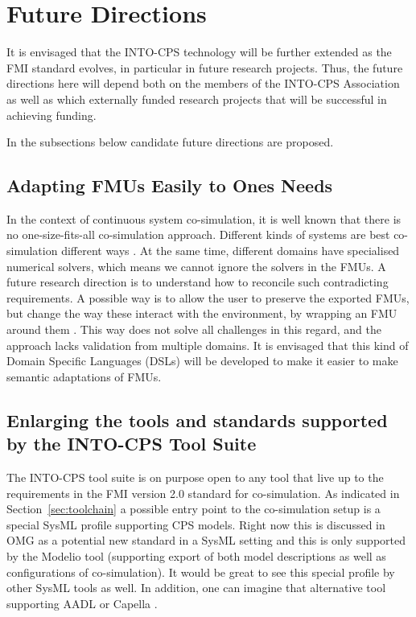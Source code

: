 %
%
%
\section{Future Directions}\label{sec:future}


It is envisaged that the INTO-CPS technology will be further extended as the FMI standard evolves, in particular in future research projects. 
Thus, the future directions here will depend both on the members of the INTO-CPS Association as well as which externally funded research projects that will be successful in achieving funding. 

In the subsections below candidate future directions are proposed.

\subsection{Adapting FMUs Easily to Ones Needs}

In the context of continuous system co-simulation, it is well known that there is no one-size-fits-all co-simulation approach. 
Different kinds of systems are best co-simulation different ways \cite{Gomes&18}.
At the same time, different domains have specialised numerical solvers, which means we cannot ignore the solvers in the FMUs.
A future research direction is to understand how to reconcile such contradicting requirements.
A possible way is to allow the user to preserve the exported FMUs, but change the way these interact with the environment, by wrapping an FMU around them \cite{Gomes&18a}.
This way does not solve all challenges in this regard, and the approach lacks validation from multiple domains. It is envisaged that this kind of Domain Specific Languages (DSLs) will be developed to make it easier to make semantic adaptations of FMUs.


\subsection{Enlarging the tools and standards supported by the INTO-CPS Tool Suite}

The INTO-CPS tool suite is on purpose open to any tool that live up to the requirements in the FMI version 2.0 standard for co-simulation. As indicated in Section~\ref{sec:toolchain} a possible entry point to the co-simulation setup is a special SysML profile supporting CPS models. Right now this is discussed in OMG as a potential new standard in a SysML setting and this is only supported by the Modelio tool (supporting export of both model descriptions as well as configurations of co-simulation). It would be great to see this special profile by other SysML tools as well. In addition, one can imagine that alternative tool supporting AADL \cite{AADL04} or Capella \cite{Roques17}.

